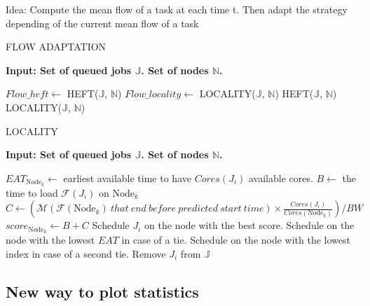 \documentclass[a4paper]{article}
\newcommand{\Node}[1]{\ensuremath{\mathrm{Node}_{#1}}\xspace}
\newcommand{\inputs}{\ensuremath{\mathcal{F}}\xspace}
\newcommand{\memory}{\ensuremath{\mathcal{M}}\xspace}
\newcommand{\bandwidth}{\mathit{BW}\xspace}
\newcommand{\core}{\mathit{Cores}\xspace}
\newcommand{\jobset}{\ensuremath{\mathbb{J}}\xspace}
\newcommand{\nodeset}{\ensuremath{\mathbb{N}}\xspace}
\begin{document}
Idea: Compute the mean flow of a task at each time t. Then adapt the strategy depending of the current mean flow of a task\\
\begin{algorithm}[htbp]
\caption{FLOW ADAPTATION}
\hspace*{\algorithmicindent} \textbf{Input: Set of queued jobs $\jobset$. Set of nodes $\nodeset$.} \\
\begin{algorithmic}[0]
	\State $Flow\_heft \gets$ HEFT($\jobset$, $\nodeset$) 
	\State $Flow\_locality \gets$ LOCALITY($\jobset$, $\nodeset$)
		\State HEFT($\jobset$, $\nodeset$) 
	\Else
		\State LOCALITY($\jobset$, $\nodeset$) 
	\EndIf
\end{algorithmic}
\end{algorithm}


\begin{algorithm}[htbp]
\caption{LOCALITY}
\hspace*{\algorithmicindent} \textbf{Input: Set of queued jobs $\jobset$. Set of nodes $\nodeset$.} \\
\begin{algorithmic}[0]
	\ForEach{$J_i \in \jobset$}
		\ForEach {$\Node{k} \in \nodeset$}
			\State $EAT_{\Node{k}} \gets$ earliest available time to have $\core(J_i)$ available cores.
			\State $B \gets$ the time to load $\inputs(J_i)$ on $\Node{k}$ 
			\State $C \gets (\memory(\inputs(\Node{k})~that~end~before~predicted~start~time) \times \frac{\core(J_i)}{\core(\Node{k})})/\bandwidth$
			\State $score_{\Node{k}} \gets B + C$
		\EndFor
		\State Schedule $J_i$ on the node with the best score. Schedule on the node with the lowest $EAT$ in case of a tie. Schedule on the node with the lowest index in case of a second tie.
		\State Remove $J_i$ from $\jobset$
	\EndFor
\end{algorithmic}
\end{algorithm}

\subsection{New way to plot statistics}
\end{document}
